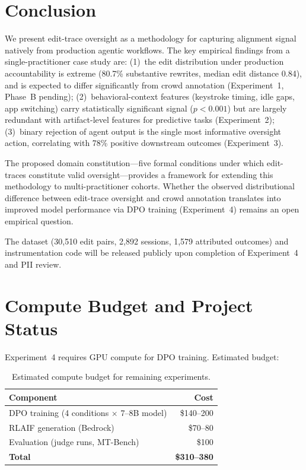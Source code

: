 \documentclass[11pt]{article}
\begin{document}
\section{Conclusion}
\label{sec:conclusion}

We present edit-trace oversight as a methodology for capturing alignment signal natively from production agentic workflows.
The key empirical findings from a single-practitioner case study are:
(1)~the edit distribution under production accountability is extreme (80.7\% substantive rewrites, median edit distance 0.84), and is expected to differ significantly from crowd annotation (Experiment~1, Phase~B pending);
(2)~behavioral-context features (keystroke timing, idle gaps, app switching) carry statistically significant signal ($p < 0.001$) but are largely redundant with artifact-level features for predictive tasks (Experiment~2);
(3)~binary rejection of agent output is the single most informative oversight action, correlating with 78\% positive downstream outcomes (Experiment~3).

The proposed domain constitution---five formal conditions under which edit-traces constitute valid oversight---provides a framework for extending this methodology to multi-practitioner cohorts.
Whether the observed distributional difference between edit-trace oversight and crowd annotation translates into improved model performance via DPO training (Experiment~4) remains an open empirical question.

The dataset (30{,}510 edit pairs, 2{,}892 sessions, 1{,}579 attributed outcomes) and instrumentation code will be released publicly upon completion of Experiment~4 and PII review.

\appendix

\section{Compute Budget and Project Status}
\label{sec:compute-budget}

Experiment~4 requires GPU compute for DPO training.
Estimated budget:

\begin{table}[h]
\centering
\caption{Estimated compute budget for remaining experiments.}
\label{tab:compute-budget}
\begin{tabular}{@{}lr@{}}
\toprule
\textbf{Component} & \textbf{Cost} \\
\midrule
DPO training (4 conditions $\times$ 7--8B model) & \$140--200 \\
RLAIF generation (Bedrock) & \$70--80 \\
Evaluation (judge runs, MT-Bench) & \$100 \\
\midrule
\textbf{Total} & \textbf{\$310--380} \\
\bottomrule
\end{tabular}
\end{table}
\end{document}
